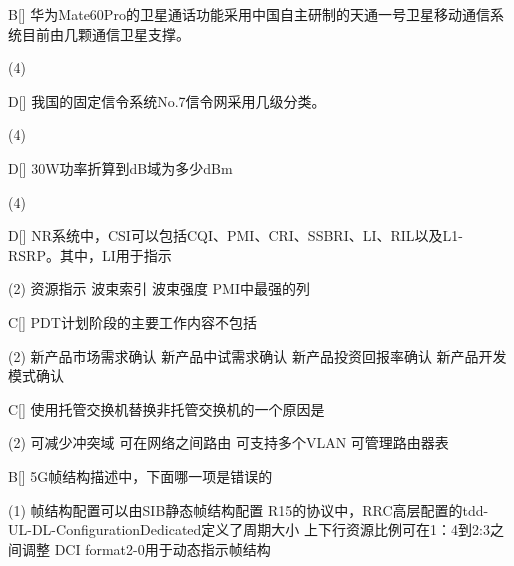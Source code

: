 \begin{choice}{B}[]
    华为Mate60Pro的卫星通话功能采用中国自主研制的天通一号卫星移动通信系统目前由几颗通信卫星支撑。
    \begin{tasks}(4)
    \end{tasks}
\end{choice}


\begin{choice}{D}[]
    我国的固定信令系统No.7信令网采用几级分类。
    \begin{tasks}(4)
    \end{tasks}
\end{choice}



\begin{choice}{D}[]
    30W功率折算到dB域为多少dBm
    \begin{tasks}(4)
    \end{tasks}
\end{choice}


\begin{choice}{D}[]
    NR系统中，CSI可以包括CQI、PMI、CRI、SSBRI、LI、RIL以及L1-RSRP。其中，LI用于指示
    \begin{tasks}(2)
        \task 资源指示
        \task 波束索引
        \task 波束强度
        \task PMI中最强的列
    \end{tasks}
\end{choice}


\begin{choice}{C}[]
    PDT计划阶段的主要工作内容不包括
    \begin{tasks}(2)
        \task 新产品市场需求确认
        \task 新产品中试需求确认
        \task 新产品投资回报率确认
        \task 新产品开发模式确认
    \end{tasks}
\end{choice}


\begin{choice}{C}[]
    使用托管交换机替换非托管交换机的一个原因是
    \begin{tasks}(2)
        \task 可减少冲突域
        \task 可在网络之间路由
        \task 可支持多个VLAN
        \task 可管理路由器表
    \end{tasks}
\end{choice}


\begin{choice}{B}[]
    5G帧结构描述中，下面哪一项是错误的
    \begin{tasks}(1)
        \task 帧结构配置可以由SIB静态帧结构配置
        \task R15的协议中，RRC高层配置的tdd-UL-DL-ConfigurationDedicated定义了周期大小
        \task 上下行资源比例可在1：4到2:3之间调整
        \task DCI format2-0用于动态指示帧结构
    \end{tasks}
\end{choice}


